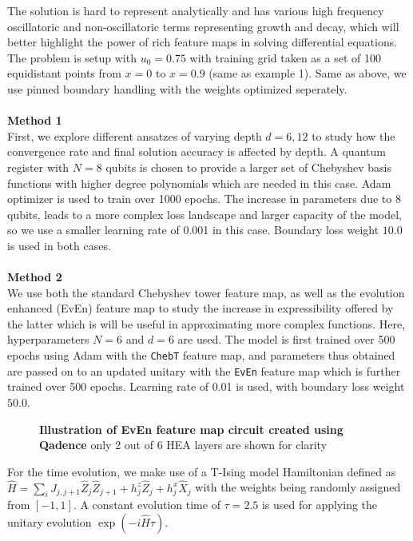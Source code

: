 \documentclass[11pt,a4paper]{article}
\begin{document}
{The solution is hard to represent analytically and has various high frequency oscillatoric and non-oscillatoric terms representing growth and decay, which will better highlight the power of rich feature maps in solving differential equations.
The problem is setup with $u_0 = 0.75$ with training grid taken as a set of 100 equidistant points from $x = 0$ to $x = 0.9$ (same as example 1). Same as above, we use pinned boundary handling with the weights optimized seperately.
\\\\
\textbf{Method 1}\\
First, we explore different ansatzes of varying depth $d = 6, 12$ to study how the convergence rate and final solution accuracy is affected by depth. A quantum register with $N = 8$ qubits is chosen to provide a larger set of Chebyshev basis functions with higher degree polynomials which are needed in this case. Adam optimizer is used to train over 1000 epochs. The increase in parameters due to 8 qubits, leads to a more complex loss landscape and larger capacity of the model, so we use a smaller learning rate of 0.001 in this case. Boundary loss weight $10.0$ is used in both cases.
\\\\
\textbf{Method 2}\\ 
We use both the standard Chebyshev tower feature map, as well as the evolution enhanced (EvEn) feature map to study the increase in expressibility offered by the latter which is will be useful in approximating more complex functions. Here, hyperparameters $N=6$ and $d=6$ are used. The model is first trained over 500 epochs using Adam with the \texttt{ChebT} feature map, and parameters thus obtained are passed on to an updated unitary with the \texttt{EvEn} feature map which is further trained over 500 epochs. Learning rate of 0.01 is used, with boundary loss weight $50.0$.

\begin{figure}[H]
    \centering
    \centering
    \caption{\textbf{Illustration of EvEn feature map circuit created using Qadence} only 2 out of 6 HEA layers are shown for clarity}
    \label{fig:EvEn-circuit}
\end{figure}

For the time evolution, we make use of a T-Ising model Hamiltonian defined as $\hat{H} = \sum_{i} J_{j,j+1}\hat{Z}_{j}\hat{Z}_{j+1} + h^{z}_{j} \hat{Z}_j + h^{x}_{j} \hat{X}_j$ with the weights being randomly assigned from $[-1, 1]$. A constant evolution time of $\tau = 2.5$ is used for applying the unitary evolution $\exp{(-i\hat{H}\tau)}$.

}
\end{document}
